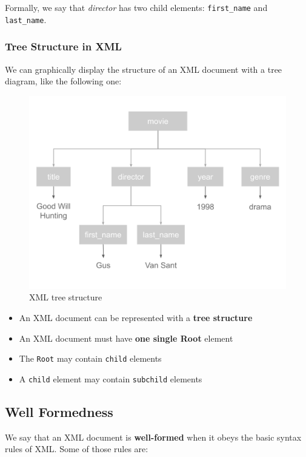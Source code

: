 \documentclass[
]{book}
\begin{document}
Formally, we say that \emph{director} has two child elements: \texttt{first\_name} and
\texttt{last\_name}.

\hypertarget{tree-structure-in-xml}{%
\subsubsection*{Tree Structure in XML}\label{tree-structure-in-xml}}

We can graphically display the structure of an XML document with a tree
diagram, like the following one:

\begin{figure}

{\centering \includegraphics[width=0.65\linewidth]{images/xml/xml-tree1} 

}

\caption{XML tree structure}\label{fig:unnamed-chunk-17}
\end{figure}

\begin{itemize}
\item
  An XML document can be represented with a \textbf{tree structure}
\item
  An XML document must have \textbf{one single Root} element
\item
  The \texttt{Root} may contain \texttt{child} elements
\item
  A \texttt{child} element may contain \texttt{subchild} elements
\end{itemize}

\hypertarget{well-formedness}{%
\subsection{Well Formedness}\label{well-formedness}}

We say that an XML document is \textbf{well-formed} when it obeys the basic syntax
rules of XML. Some of those rules are:
\end{document}
